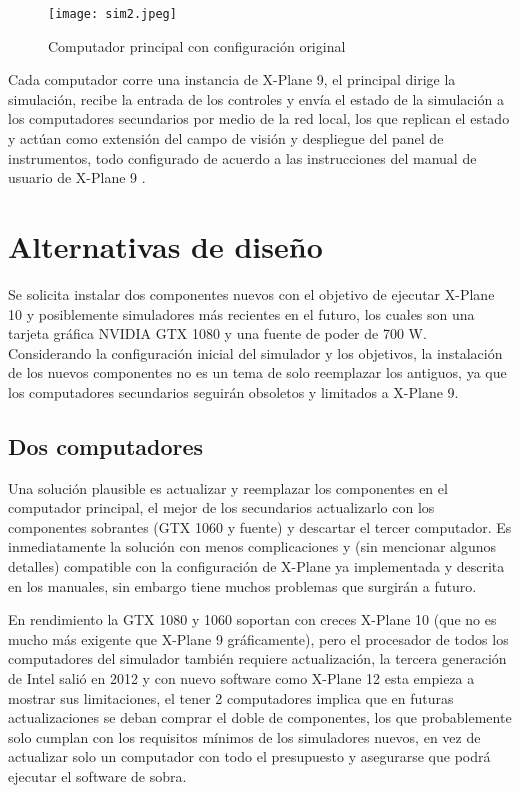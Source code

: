 \begin{figure}[h]
	\centering
	\texttt{[image: sim2.jpeg]}
	\caption{Computador principal con configuración original}
	\label{fig:sim2}
\end{figure}

Cada computador corre una instancia de X-Plane 9, el principal dirige la simulación, recibe la entrada de los controles y envía el estado de la simulación a los computadores secundarios por medio de la red local, los que replican el estado y actúan como extensión del campo de visión y despliegue del panel de instrumentos, todo configurado de acuerdo a las instrucciones del manual de usuario de X-Plane 9 \cite{manual9}.

\section{Alternativas de diseño}

Se solicita instalar dos componentes nuevos con el objetivo de ejecutar X-Plane 10 y posiblemente simuladores más recientes en el futuro, los cuales son una tarjeta gráfica NVIDIA GTX 1080 y una fuente de poder de 700 W. Considerando la configuración inicial del simulador y los objetivos, la instalación de los nuevos componentes no es un tema de solo reemplazar los antiguos, ya que los computadores secundarios seguirán obsoletos y limitados a X-Plane 9.

\subsection{Dos computadores}

Una solución plausible es actualizar y reemplazar los componentes en el computador principal, el mejor de los secundarios actualizarlo con los componentes sobrantes (GTX 1060 y fuente) y descartar el tercer computador. Es inmediatamente la solución con menos complicaciones y (sin mencionar algunos detalles) compatible con la configuración de X-Plane ya implementada y descrita en los manuales, sin embargo tiene muchos problemas que surgirán a futuro.

En rendimiento la GTX 1080 y 1060 soportan con creces X-Plane 10 (que no es mucho más exigente que X-Plane 9 gráficamente), pero el procesador de todos los computadores del simulador también requiere actualización, la tercera generación de Intel salió en 2012 y con nuevo software como X-Plane 12 esta empieza a mostrar sus limitaciones, el tener 2 computadores implica que en futuras actualizaciones se deban comprar el doble de componentes, los que probablemente solo cumplan con los requisitos mínimos de los simuladores nuevos, en vez de actualizar solo un computador con todo el presupuesto y asegurarse que podrá ejecutar el software de sobra.

